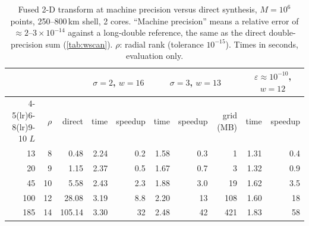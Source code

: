 \begin{table}[!htbp]\centering\small\setlength{\tabcolsep}{4.5pt}
\caption{Fused 2-D transform at machine precision versus direct synthesis, $M=10^6$ points, 250--800\,km shell, 2 cores.
``Machine precision'' means a relative error of $\approx2$--$3\times10^{-14}$ against a long-double reference, the same as
the direct double-precision sum (\cref{tab:wscan}). $\rho$: radial rank (tolerance $10^{-15}$). Times in seconds, evaluation only.}\label{tab:exact}
\begin{tabular}{rrr rr rrr rr}\toprule
&&&\multicolumn{2}{c}{$\sigma=2$, $w=16$}&\multicolumn{3}{c}{$\sigma=3$, $w=13$}&\multicolumn{2}{c}{$\varepsilon\approx10^{-10}$, $w=12$}\\
\cmidrule(lr){4-5}\cmidrule(lr){6-8}\cmidrule(lr){9-10}
$L$&$\rho$&direct&time&speedup&time&speedup&grid (MB)&time&speedup\\\midrule
13 & 8 & 0.48 & 2.24 & 0.2 & 1.58 & 0.3 & 1 & 1.31 & 0.4\\
20 & 9 & 1.15 & 2.37 & 0.5 & 1.67 & 0.7 & 3 & 1.32 & 0.9\\
45 & 10 & 5.58 & 2.43 & 2.3 & 1.88 & 3.0 & 19 & 1.62 & 3.5\\
100 & 12 & 28.08 & 3.19 & 8.8 & 2.20 & 13 & 108 & 1.60 & 18\\
185 & 14 & 105.14 & 3.30 & 32 & 2.48 & 42 & 421 & 1.83 & 58\\
\bottomrule\end{tabular}\end{table}
